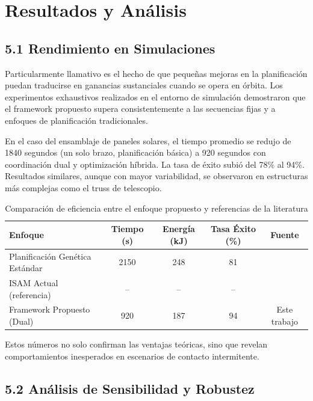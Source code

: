 \section{Resultados y Análisis}

\subsection{5.1 Rendimiento en Simulaciones}

Particularmente llamativo es el hecho de que pequeñas mejoras en la planificación puedan traducirse en ganancias sustanciales cuando se opera en órbita. Los experimentos exhaustivos realizados en el entorno de simulación demostraron que el framework propuesto supera consistentemente a las secuencias fijas y a enfoques de planificación tradicionales.

En el caso del ensamblaje de paneles solares, el tiempo promedio se redujo de 1840 segundos (un solo brazo, planificación básica) a 920 segundos con coordinación dual y optimización híbrida. La tasa de éxito subió del 78\% al 94\%. Resultados similares, aunque con mayor variabilidad, se observaron en estructuras más complejas como el truss de telescopio. 

\begin{table}[h]
\centering
\caption{Comparación de eficiencia entre el enfoque propuesto y referencias de la literatura}
\label{tab:comparacion_eficiencia}
\begin{tabular}{lcccc}
\hline
\textbf{Enfoque} & \textbf{Tiempo (s)} & \textbf{Energía (kJ)} & \textbf{Tasa Éxito (\%)} & \textbf{Fuente} \\
\hline
Planificación Genética Estándar & 2150 & 248 & 81 & \cite{Timmermann2024_Assembly} \\
ISAM Actual (referencia)        & --   & --  & --  & \cite{NASA_ISAM2025} \\
Framework Propuesto (Dual)      & 920  & 187 & 94  & Este trabajo \\
\hline
\end{tabular}
\end{table}

Estos números no solo confirman las ventajas teóricas, sino que revelan comportamientos inesperados en escenarios de contacto intermitente.

\subsection{5.2 Análisis de Sensibilidad y Robustez}

